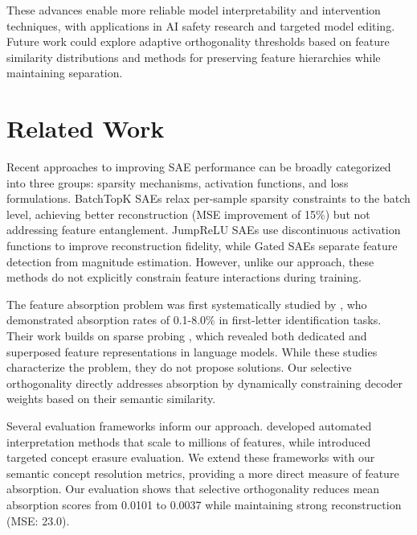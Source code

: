 \documentclass{article} %
\begin{document}
These advances enable more reliable model interpretability and intervention techniques, with applications in AI safety research and targeted model editing. Future work could explore adaptive orthogonality thresholds based on feature similarity distributions and methods for preserving feature hierarchies while maintaining separation.

\section{Related Work}
\label{sec:related}

Recent approaches to improving SAE performance can be broadly categorized into three groups: sparsity mechanisms, activation functions, and loss formulations. BatchTopK SAEs \cite{bussmannBatchTopKSparseAutoencoders2024} relax per-sample sparsity constraints to the batch level, achieving better reconstruction (MSE improvement of 15\%) but not addressing feature entanglement. JumpReLU SAEs \cite{rajamanoharanJumpingAheadImproving2024} use discontinuous activation functions to improve reconstruction fidelity, while Gated SAEs \cite{rajamanoharanImprovingDictionaryLearning2024} separate feature detection from magnitude estimation. However, unlike our approach, these methods do not explicitly constrain feature interactions during training.

The feature absorption problem was first systematically studied by \cite{chaninAbsorptionStudyingFeature2024}, who demonstrated absorption rates of 0.1-8.0\% in first-letter identification tasks. Their work builds on sparse probing \cite{gurneeFindingNeuronsHaystack2023}, which revealed both dedicated and superposed feature representations in language models. While these studies characterize the problem, they do not propose solutions. Our selective orthogonality directly addresses absorption by dynamically constraining decoder weights based on their semantic similarity.

Several evaluation frameworks inform our approach. \cite{pauloAutomaticallyInterpretingMillions2024} developed automated interpretation methods that scale to millions of features, while \cite{karvonenEvaluatingSparseAutoencoders2024} introduced targeted concept erasure evaluation. We extend these frameworks with our semantic concept resolution metrics, providing a more direct measure of feature absorption. Our evaluation shows that selective orthogonality reduces mean absorption scores from 0.0101 to 0.0037 while maintaining strong reconstruction (MSE: 23.0).
\end{document}

